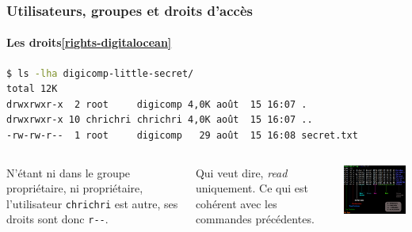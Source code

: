 \documentclass{beamer}
\begin{document}
    \begin{frame}[fragile]
        \transdissolve
        \frametitle{Utilisateurs, groupes et droits d'accès}
        \framesubtitle{Les droits\cref{rights-digitalocean}}
        \begin{lstlisting}[language=bash]
$ ls -lha digicomp-little-secret/
total 12K
drwxrwxr-x  2 root     digicomp 4,0K août  15 16:07 .
drwxrwxr-x 10 chrichri chrichri 4,0K août  15 16:07 ..
-rw-rw-r--  1 root     digicomp   29 août  15 16:08 secret.txt
        \end{lstlisting}
        \begin{columns}
            N'étant ni dans le groupe propriétaire, ni propriétaire, l'utilisateur \lstinline{chrichri} est autre, ses droits sont donc \lstinline{r--}.

            Qui veut dire, \textit{read} uniquement.
            Ce qui est cohérent avec les commandes précédentes.
            \begin{center}
                \includegraphics[width=6.5cm]{image/ls-details}
            \end{center}
        \end{columns}
    \end{frame}
\end{document}
